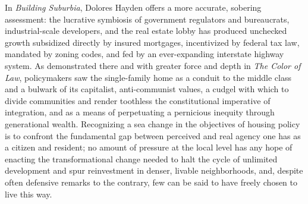 \documentclass[oneside, a5paper]{book}
\begin{document}
In \textit{Building Suburbia}, Dolores Hayden offers a more accurate, sobering assessment: the lucrative symbiosis of government regulators and bureaucrats, industrial-scale developers, and the real estate lobby has produced unchecked growth subsidized directly by insured mortgages, incentivized by federal tax law, mandated by zoning codes, and fed by an ever-expanding interstate highway system. As demonstrated there and with greater force and depth in \textit{The Color of Law}, policymakers saw the single-family home as a conduit to the middle class and a bulwark of its capitalist, anti-communist values, a cudgel with which to divide communities and render toothless the constitutional imperative of integration, and as a means of perpetuating a pernicious inequity through generational wealth. Recognizing a sea change in the objectives of housing policy is to confront the fundamental gap between perceived and real agency one has as a citizen and resident; no amount of pressure at the local level has any hope of enacting the transformational change needed to halt the cycle of unlimited development and spur reinvestment in denser, livable neighborhoods, and, despite often defensive remarks to the contrary, few can be said to have freely chosen to live this way.
\end{document}
